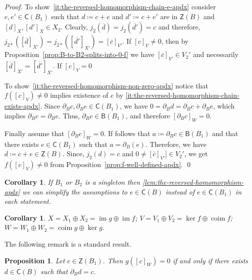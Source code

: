 \documentclass[letterpaper,11pt]{article}
\theoremstyle{plain}
\newtheorem{proposition}[theorem]{Proposition}
\newtheorem{corollary}[theorem]{Corollary}
\theoremstyle{definition}
\newcommand{\im}{\operatorname{im}}
\newcommand{\coim}{\operatorname{coim}}
\newcounter{li}
\newcommand{\Zgroup}{\mathsf{Z}}
\newcommand{\Bgroup}{\mathsf{B}}
\newcommand{\Cgroup}{\mathsf{C}}
\newcommand{\imap}[1]{j_{#1}}
\newcommand{\imapx}[1]{j_{#1\ast}}
\begin{document}
{\begin{proof}
    To show~\ref{it:the-reversed-homomorphism-chain-e-apdx} consider $e,e'\in\Cgroup(B_1)$ such that $d\coloneqq c+e$ and $d'\coloneqq c+e'$ are in $\Zgroup(B)$ and $[d]_X,[d']_X\in X_2$. 
    Clearly, $\imap{2}(\overline{d})=\imap{2}(\overline{d'})=c$
        and therefore, $\imapx{2}([\overline{d}]_{X'})=\imapx{2}([\overline{d'}]_{X'})=[\overline{c}]_{V'}$.
    If $[c]_V\neq 0$, then by Proposition~\ref{prop:B-to-B2-splits-into-0-f} we have $[\overline{c}]_{V'}\in V_2'$ and necessarily $[\overline{d}]_{X'}=[\overline{d'}]_{X'}$.
    If $[c]_V= 0$   
    
    To show~\ref{it:the-reversed-homomorphism-non-zero-apdx} notice that  $f([c]_V)\neq 0$ implies existence of $e$ by \ref{it:the-reversed-homomorphism-chain-exists-apdx}. 
    Since $\partial_B c, \partial_B e\in\Cgroup(B_1)$, we have $0=\partial_B d= \partial_B c + \partial_B e$, which implies $\partial_B c = \partial_B e$. 
    Thus, $\partial_B c\in\Bgroup(B_1)$, and therefore $[\partial_B c]_W=0$.
    
    Finally assume that $[\partial_B c]_W=0$.
    If follows that $a\coloneqq\partial_B c\in\Bgroup(B_1)$ and that there exists $e\in\Cgroup(B_1)$ such that $a=\partial_B(e)$.
    Therefore, we have $d\coloneqq c+e\in\Zgroup(B)$.
    Since, $\imap{2}(d)=c$ and $0\neq[\overline{c}]_{V'}]\in V_2'$, we get $f([c]_V)\neq 0$ from Proposition~\ref{prop:f-well-defined-apdx}.
    \qed
\end{proof}

\begin{corollary}
    If $B_1$ or $B_2$ is a singleton then \ref{lem:the-reversed-homomorphism-apdx} we can simplify the assumptions to $e\in\Cgroup(B)$ instead of $e\in\Cgroup(B_1)$ in each statement.
\end{corollary}

\begin{corollary}\label{cor:splitting-into-im-g-im-f-apdx}
    $X=X_1\oplus X_2=\im g\oplus\im f$;
    $V=V_1\oplus V_2=\ker f\oplus\coim f$;
    $W=W_1\oplus W_2=\coim g\oplus\ker g$.
\end{corollary}

\hspace{0.5cm}
The following remark is a standard result.
\begin{proposition}\label{prop:chains-in-map-g}
    Let $c\in\Zgroup(B_1)$.
    Then $g([c]_{W})=0$ if and only if there exists $d\in\Cgroup(B)$ such that $\partial_B d = c$.
\end{proposition}
}
\end{document}
